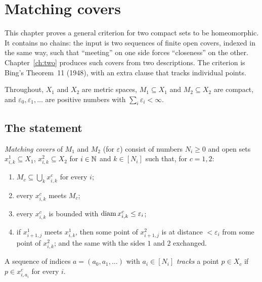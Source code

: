 \chapter{Matching covers}\label{ch:matching}

This chapter proves a general criterion for two compact sets to be homeomorphic. It contains no
chains: the input is two sequences of finite open covers, indexed in the same way, such that
``meeting'' on one side forces ``closeness'' on the other. Chapter~\ref{ch:two} produces such covers
from two descriptions. The criterion is Bing's Theorem~11 (1948), with an extra clause that tracks
individual points.

Throughout, $X_1$ and $X_2$ are metric spaces, $M_1\subseteq X_1$ and $M_2\subseteq X_2$ are compact, and
$\varepsilon_0,\varepsilon_1,\dots$ are positive numbers with $\sum_i\varepsilon_i<\infty$.

\section{The statement}

\begin{definition}\label{def:matching}
\emph{Matching covers} of $M_1$ and $M_2$ (for $\varepsilon$) consist of numbers $N_i\ge0$ and open sets
$x^1_{i,k}\subseteq X_1$, $x^2_{i,k}\subseteq X_2$ for $i\in\mathbb{N}$ and $k\in[N_i]$ such that, for $c=1,2$:
\begin{enumerate}[label=(M\arabic*)]
\item\label{M:cover} $M_c\subseteq\bigcup_kx^c_{i,k}$ for every $i$;
\item\label{M:meet} every $x^c_{i,k}$ meets $M_c$;
\item\label{M:diam} every $x^c_{i,k}$ is bounded with $\operatorname{diam} x^c_{i,k}\le\varepsilon_i$;
\item\label{M:match} if $x^1_{i+1,j}$ meets $x^1_{i,k}$, then some point of $x^2_{i+1,j}$ is at distance $<\varepsilon_i$ from
some point of $x^2_{i,k}$; and the same with the sides $1$ and $2$ exchanged.
\end{enumerate}
A sequence of indices $a=(a_0,a_1,\dots)$ with $a_i\in[N_i]$ \emph{tracks} a point $p\in X_c$ if $p\in x^c_{i,a_i}$ for
every $i$.
\end{definition}


